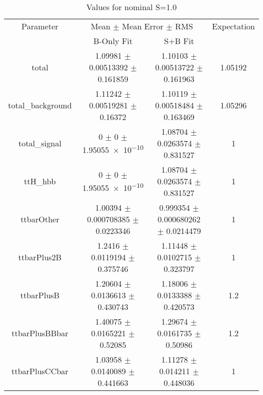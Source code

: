 \begin{table}
\centering
\caption{Values for nominal S=1.0}
\begin{tabular}{cccc}
\toprule
Parameter & \multicolumn{2}{c}{Mean $\pm$ Mean Error $\pm$ RMS} & Expectation\\
 & B-Only Fit & S+B Fit & \\
\midrule
total & \num{1.09981} $\pm$ \num{0.00513392} $\pm$ \num{0.161859} & \num{1.10103} $\pm$ \num{0.00513722} $\pm$ \num{0.161963} & \num{1.05192}\\
total\_background & \num{1.11242} $\pm$ \num{0.00519281} $\pm$ \num{0.16372} & \num{1.10119} $\pm$ \num{0.00518484} $\pm$ \num{0.163469} & \num{1.05296}\\
total\_signal & \num{0} $\pm$ \num{0} $\pm$ \num{1.95055e-10} & \num{1.08704} $\pm$ \num{0.0263574} $\pm$ \num{0.831527} & \num{1}\\
ttH\_hbb & \num{0} $\pm$ \num{0} $\pm$ \num{1.95055e-10} & \num{1.08704} $\pm$ \num{0.0263574} $\pm$ \num{0.831527} & \num{1}\\
ttbarOther & \num{1.00394} $\pm$ \num{0.000708385} $\pm$ \num{0.0223346} & \num{0.999354} $\pm$ \num{0.000680262} $\pm$ \num{0.0214479} & \num{1}\\
ttbarPlus2B & \num{1.2416} $\pm$ \num{0.0119194} $\pm$ \num{0.375746} & \num{1.11448} $\pm$ \num{0.0102715} $\pm$ \num{0.323797} & \num{1}\\
ttbarPlusB & \num{1.20604} $\pm$ \num{0.0136613} $\pm$ \num{0.430743} & \num{1.18006} $\pm$ \num{0.0133388} $\pm$ \num{0.420573} & \num{1.2}\\
ttbarPlusBBbar & \num{1.40075} $\pm$ \num{0.0165221} $\pm$ \num{0.52085} & \num{1.29674} $\pm$ \num{0.0161735} $\pm$ \num{0.50986} & \num{1.2}\\
ttbarPlusCCbar & \num{1.03958} $\pm$ \num{0.0140089} $\pm$ \num{0.441663} & \num{1.11278} $\pm$ \num{0.014211} $\pm$ \num{0.448036} & \num{1}\\
\bottomrule
\end{tabular}
\end{table}